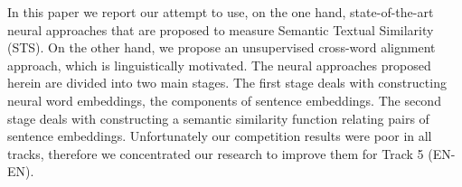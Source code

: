 In this paper we report our attempt to use, on the one hand, state-of-the-art neural approaches that are proposed to measure Semantic Textual Similarity (STS). On the other hand, we propose an unsupervised cross-word alignment approach, which is linguistically motivated. The neural approaches proposed herein are divided into two main stages. The first stage deals with constructing neural word embeddings, the components of sentence embeddings. The second stage deals with constructing a semantic similarity function relating pairs of sentence embeddings. Unfortunately our competition results were poor in all tracks, therefore we concentrated our research to improve them for Track 5 (EN-EN).
